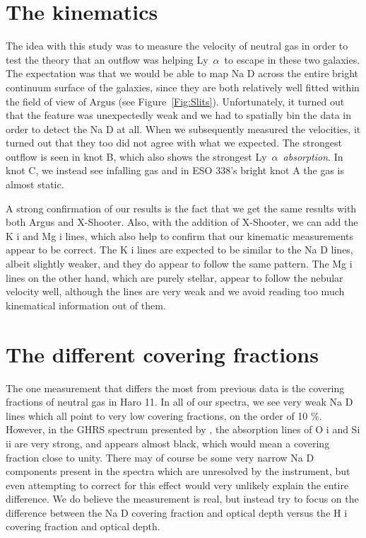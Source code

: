 \documentclass[a4wide,12pt]{book}
\newcommand{\lya}{Ly~${\alpha}$}
\begin{document}
{\section{The kinematics}

The idea with this study was to measure the velocity of neutral gas in order to test the theory that an outflow was helping \lya\ to escape in these two galaxies. The expectation was that we would be able to map Na D across the entire bright continuum surface of the  galaxies, since they are both relatively well fitted within the field of view of Argus (see Figure~\ref{Fig:Slits}). Unfortunately, it turned out that the feature was unexpectedly weak and we had to spatially bin the data in order to detect the Na D at all. When we subsequently measured the velocities, it turned out that they too did not agree with what we expected. The strongest outflow is seen in knot B, which also shows the strongest \lya\ {\em absorption}. In knot C, we instead see infalling gas and in ESO 338's bright knot A the gas is almost static. 

A strong confirmation of our results is the fact that we get the same results with both Argus and X-Shooter. Also, with the addition of X-Shooter, we can add the K {\sc i} and Mg {\sc i} lines, which also help to confirm that our kinematic measurements appear to be correct. The K {\sc i} lines are expected to be similar to the Na D lines, albeit slightly weaker, and they do appear to follow the same pattern. The Mg {\sc i} lines on the other hand, which are purely stellar, appear to follow the nebular velocity well, although the lines are very weak and we avoid reading too much kinematical information out of them. 

\section{The different covering fractions}

The one measurement that differs the most from previous data is the covering fractions of neutral gas in Haro 11. In all of our spectra, we see very weak Na D lines which all point to very low covering fractions, on the order of 10 \%. However, in the GHRS spectrum presented by \citet{kunth-1998}, the absorption lines of O {\sc i} and Si {\sc ii} are very strong, and appears almost black, which would mean a covering fraction close to unity. There may of course be some very narrow Na D components present in the spectra which are unresolved by the instrument, but even attempting to correct for this effect would very unlikely explain the entire difference. We do believe the measurement is real, but instead try to focus on the difference between the Na D covering fraction and optical depth versus the H {\sc i} covering fraction and optical depth. 

}
\end{document}
